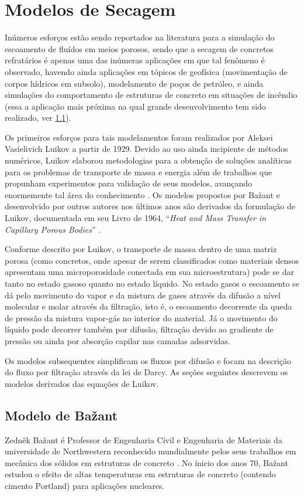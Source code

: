 \section{Modelos de Secagem}\label{modelos}
Inúmeros esforços estão sendo reportados na literatura para a simulação do escoamento
de fluídos em meios porosos, sendo que a secagem de concretos refratários é apenas uma das
inúmeras aplicações em que tal fenômeno é observado, havendo ainda
aplicações em tópicos de geofísica (movimentação de corpos hídricos em subsolo),
modelamento de poços de petróleo, e ainda simulações do comportamento de
estruturas de concreto em situações de incêndio (essa a aplicação mais próxima
na qual grande desenvolvimento tem sido realizado, ver \ref{sec:bazant}).


Os primeiros esforços para tais modelamentos foram realizados por Aleksei
Vasielivich Luikov \cite{martynenko2010} a partir de 1929. Devido ao uso ainda
incipiente de métodos numéricos, Luikov elaborou metodologias para a obtenção de
soluções analíticas para os problemas de transporte de massa e energia além de
trabalhos que propunham experimentos para validação de seus modelos, avançando
enormemente tal área do conhecimento \cite{Mikhailov1983}. Os modelos propostos
por Ba\v{z}ant e desenvolvido por outros autores nos últimos anos são derivados da
formulação de Luikov, documentada em seu Livro de 1964, ``\textit{Heat and Mass
  Transfer in Capillary Porous Bodies}'' \cite{luikov1964heat}.

Conforme descrito por Luikov, o transporte de massa dentro de uma matriz porosa
(como concretos, onde apesar de serem classificados como materiais densos
apresentam uma microporosidade conectada em sua microestrutura)
pode se dar tanto no estado gasoso quanto no estado líquido. No estado gasos o
escoamento se dá pelo movimento do vapor e da mistura de gases através da difusão a
nível molecular e molar através da filtração, isto é, o escoamento decorrente
da queda de pressão da mistura vapor-gás no interior do material. Já o movimento
do líquido pode decorrer também por difusão, filtração devido ao gradiente de
pressão ou ainda por absorção capilar nas camadas adsorvidas.

Os modelos subsequentes simplificam os fluxos por difusão e focam na descrição
do fluxo por filtração através da lei de Darcy. As seções seguintes descrevem os
modelos derivados das equações de Luikov.
    
    
\subsection{Modelo de Ba\v{z}ant}\label{sec:bazant}
Zedn\v{e}k Ba\v{z}ant é Professor de Engenharia Cívil e Engenharia de Materiais
da universidade de Northwestern reconhecido mundialmente pelos seus trabalhos em
mecânica dos sólidos em estruturas de concreto \cite{bundesen2004biography}. No
ínicio dos anos 70, Ba\v{z}ant estudou o efeito de altas temperaturas em
estruturas de concreto (contendo cimento Portland) para aplicações nucleares.
    
